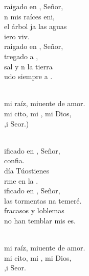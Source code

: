 \documentclass[12pt]{article}
\begin{document}
\begin{multicols*}{2}
\begin{cancion}[Tú, mi raíz][Ixcís]%
	raigado en , Señor,\\
	n mis raíces eni,\\
	 el árbol ja las aguas\\
	iero viv.\\
	raigado en , Señor,\\
	tregado a ,\\
	 sal y n la tierra\\
	udo siempre a .\\\jump\\
	\begin{chorus}%
	 mi raíz, miuente de amor. \\
	 mi cito, mi , mi Dios, \\
	,i Seor.) \\
	\end{chorus}%
	\jump\\
	ificado en , Señor,\\
	 confia. \\
	 día Túostienes \\
	rme en la .\\
	ificado en , Señor,\\
	 las tormentas na temeré.\\
	fracasos y loblemas\\
	no han temblar mis es. \\\jump\\
	\begin{chorus}%
	 mi raíz, miuente de amor. \\
	 mi cito, mi , mi Dios, \\
	,i Seor.   \\
	\end{chorus}%
	\jump\\
\end{cancion}%


\end{multicols*}
\end{document}
